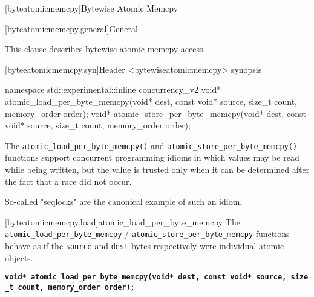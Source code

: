
[byteatomicmemcpy]{Bytewise Atomic Memcpy}

[byteatomicmemcpy.general]{General}

This clause describes bytewise atomic memcpy access. 


[byteeatomicmemcpy.syn]{Header <bytewiseatomicmemcpy> synopsis}

\begin{codeblock}
namespace std::experimental::inline concurrency_v2 {
  void* atomic_load_per_byte_memcpy(void* dest, const void* source, size_t count, memory_order order);
  void* atomic_store_per_byte_memcpy(void* dest, const void* source, size_t count, memory_order order);
}
\end{codeblock}

\pnum

The \texttt{atomic\_load\_per\_byte\_memcpy()} and
\texttt{atomic\_store\_per\_byte\_memcpy()} functions support concurrent
programming idioms in which values may be read while being written, but
the value is trusted only when it can be determined after the fact that
a race did not occur. \begin{note} So-called "seqlocks" are the canonical
example of such an idiom. \end{note}


[byteatomicmemcpy.load]{atomic_load_per_byte_memcpy}
\pnum
The \texttt{atomic\_load\_per\_byte\_memcpy} /
\texttt{atomic\_store\_per\_byte\_memcpy} functions behave as if the
\texttt{source} and \texttt{dest} bytes respectively were individual
atomic objects.

\textbf{\texttt{void*\ atomic\_load\_per\_byte\_memcpy(void*\ dest,\ const\ void*\ source,\ size\_t\ count,\ memory\_order\ order);}}

